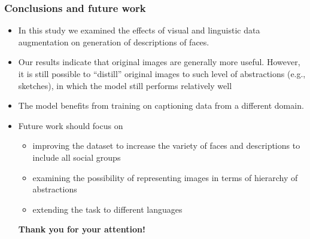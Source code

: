 \documentclass[aspectratio=1610]{beamer} %
\begin{document}
\begin{frame}
\frametitle{Conclusions and future work}
\begin{itemize}

\item In this study we examined the effects of visual and linguistic data augmentation on generation of descriptions of faces.
\item Our results indicate that original images are generally more useful. However, it is still possible to ``distill'' original images to such level of abstractions (e.g., sketches), in which the model still performs relatively well
\item The model benefits from training on captioning data from a different domain.
\pause
\item Future work should focus on
\begin{itemize}
	\item improving the dataset to increase the variety of faces and descriptions to include all social groups %
	\item examining the possibility of representing images in terms of hierarchy of abstractions
	\item extending the task %
              to different languages
\end{itemize}

\pause
\textbf{Thank you for your attention!}

\end{itemize}
\end{frame}
\end{document}
